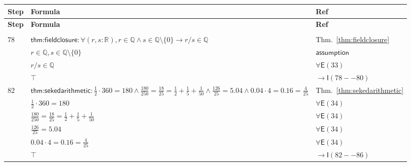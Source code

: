\documentclass[12pt]{amsart}
\newcommand{\br}{,\allowbreak}
\newcommand{\R}{\mathbb{R}}
\newenvironment{prooftable}{%
	\renewcommand{\arraystretch}{1.2}%
	\setlength{\tabcolsep}{4pt}%
	\setlength{\arrayrulewidth}{0.05pt}
	\tiny
	\sloppy
	\begin{longtable}{
			|>{\centering\arraybackslash}m{0.7cm}|
			>{\raggedright\centering\arraybackslash}m{0.70\textwidth}|
			>{\centering\arraybackslash}m{3.5cm}|  %
		}%
		\hline
		\textbf{Step} & \centering\textbf{Formula} & \textbf{Ref} \\
		\hline
		\endfirsthead
		\hline
		\textbf{Step} & \centering\textbf{Formula} & \textbf{Ref} \\
		\hline
		\endhead
		\hline
		\multicolumn{3}{r}{\textit{Continued on next page}} \\
		\endfoot
		\hline
		\endlastfoot
	}{%
	\end{longtable}%
}
\newcommand{\thicksoliddoubleline}{%
	\noalign{\vskip1pt}%
	\noalign{\hrule height 0.2pt}%
	\noalign{\vskip0.2pt}%
	\noalign{\hrule height 0.2pt}%
	\noalign{\vskip1pt}%
}
\begin{document}
\begin{prooftable}
	\thicksoliddoubleline
	78 & $\textsf{thm:fieldclosure}: \forall(r \br s:\R) \br  r\in\mathbb{Q}\land s\in\mathbb{Q}\setminus\{0\}\to r/s\in\mathbb{Q}$ & Thm.~\ref{thm:fieldclosure} \\
	\hdashline
	79 & $r\in\mathbb{Q} \br  s\in\mathbb{Q}\setminus\{0\}$ & $\mathsf{assumption}$ \\
	\hdashline
	80 & $r/s\in\mathbb{Q}$ & $\forall \mathsf{E}(33)$ \\
	\hdashline
	81 & $\top$ & $\to \mathsf{I}(78--80)$ \\
	
	\thicksoliddoubleline
	82 & $\textsf{thm:sekedarithmetic}: \frac12\cdot360=180 \land \frac{180}{250}=\frac{18}{25}=\frac12+\frac15+\frac1{50} \land \frac{126}{25}=5.04 \land 0.04\cdot4=0.16=\frac4{25}$ & Thm.~\ref{thm:sekedarithmetic} \\
	\hdashline
	83 & $\frac12\cdot360=180$ & $\forall \mathsf{E}(34)$ \\
	\hdashline
	84 & $\frac{180}{250}=\frac{18}{25}=\frac12+\frac15+\frac1{50}$ & $\forall \mathsf{E}(34)$ \\
	\hdashline
	85 & $\frac{126}{25}=5.04$ & $\forall \mathsf{E}(34)$ \\
	\hdashline
	86 & $0.04\cdot4=0.16=\frac4{25}$ & $\forall \mathsf{E}(34)$ \\
	\hdashline
	87 & $\top$ & $\to \mathsf{I}(82--86)$ \\
	

\end{prooftable}
\end{document}
